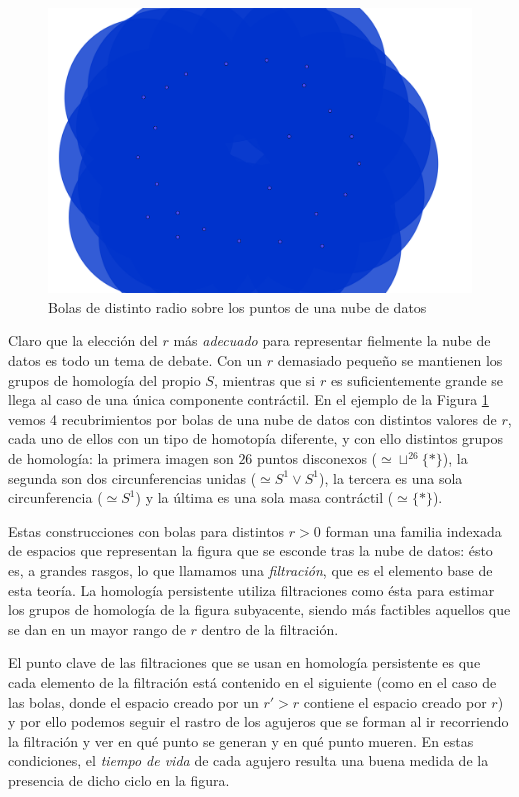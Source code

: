 \documentclass[12pt,a4paper,twoside]{article} %
\theoremstyle{plain}
\theoremstyle{definition}
\begin{document}
\begin{figure}[h!]
\includegraphics[scale=0.25]{img/cloud402.png}
\caption{Bolas de distinto radio sobre los puntos de una nube de datos}
\label{epsilons}
\end{figure}

Claro que la elección del $r$ más \emph{adecuado} para representar fielmente la nube de datos es todo un tema de debate. Con un $r$ demasiado pequeño se mantienen los grupos de homología del propio $S$, mientras que si $r$ es suficientemente grande se llega al caso de una única componente contráctil. En el ejemplo de la Figura \ref{epsilons} vemos 4 recubrimientos por bolas de una nube de datos con distintos valores de $r$, cada uno de ellos con un tipo de homotopía diferente, y con ello distintos grupos de homología: la primera imagen son $26$ puntos disconexos ($\simeq \sqcup^{26} \{ * \}$), la segunda son dos circunferencias unidas ($\simeq S^1 \vee S^1$), la tercera es una sola circunferencia ($\simeq S^1$) y la última es una sola masa contráctil ($\simeq \{ * \}$).  

Estas construcciones con bolas para distintos $r>0$ forman una familia indexada de espacios que representan la figura que se esconde tras la nube de datos: ésto es, a grandes rasgos, lo que llamamos una \emph{filtración}, que es el elemento base de esta teoría. La homología persistente utiliza filtraciones como ésta para estimar los grupos de homología de la figura subyacente, siendo más factibles aquellos que se dan en un mayor rango de $r$ dentro de la filtración.

El punto clave de las filtraciones que se usan en homología persistente es que cada elemento de la filtración está contenido en el siguiente (como en el caso de las bolas, donde  el espacio creado por un $r' > r$ contiene el espacio creado por $r$) y por ello podemos seguir el rastro de los agujeros que se forman al ir recorriendo la filtración y ver en qué punto se generan y en qué punto mueren. En estas condiciones, el \emph{tiempo de vida} de cada agujero resulta una buena medida de la presencia de dicho ciclo en la figura.
\end{document}
